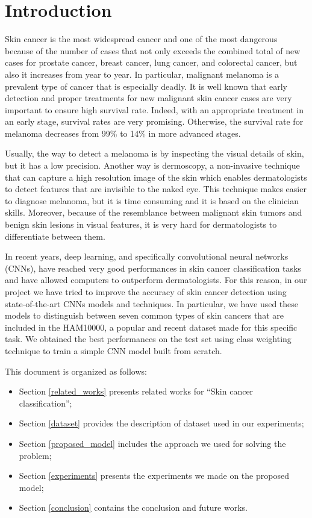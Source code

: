 \section{Introduction} \label{introduction}

	Skin cancer is the most widespread cancer and one of the most dangerous because of the number of cases that not only exceeds the combined total of new cases for prostate cancer, breast cancer, lung cancer, and colorectal cancer, but also it increases from year to year. In particular, malignant melanoma is a prevalent type of cancer that is especially deadly. It is well known that early detection and proper treatments for new malignant skin cancer cases are very important to ensure high survival rate. Indeed, with an appropriate treatment in an early stage, survival rates are very promising. Otherwise, the survival rate for melanoma decreases from 99\% to 14\% in more advanced stages.
	
	\smallskip
	
	Usually, the way to detect a melanoma is by inspecting the visual details of skin, but it has a low precision. Another way is dermoscopy, a non-invasive technique that can capture a high resolution image of the skin which enables dermatologists to detect features that are invisible to the naked eye. This technique makes easier to diagnose melanoma, but it is time consuming and it is based on the clinician skills. Moreover, because of the resemblance between malignant skin tumors and benign skin lesions in visual features, it is very hard for dermatologists to differentiate between them.
	
	\smallskip
	
	In recent years, deep learning, and specifically convolutional neural networks (CNNs), have reached very good performances in skin cancer classification tasks and have allowed computers to outperform dermatologists. For this reason, in our project we have tried to improve the accuracy of skin cancer detection using state-of-the-art CNNs models and techniques. In particular, we have used these models to distinguish between seven common types of skin cancers that are included in the HAM10000, a popular and recent dataset made for this specific task. We obtained the best performances on the test set using class weighting technique to train a simple CNN model built from scratch. 
	
	\bigskip
	
	This document is organized as follows:  
	\begin{itemize}
		\item Section \ref{related_works} presents related works for ``Skin cancer classification'';
		\item Section \ref{dataset} provides the description of dataset used in our experiments;
		\item Section \ref{proposed_model} includes the approach we used for solving the problem;
		\item Section \ref{experiments} presents the experiments we made on the proposed model;
		\item Section \ref{conclusion} contains the conclusion and future works.
	\end{itemize}